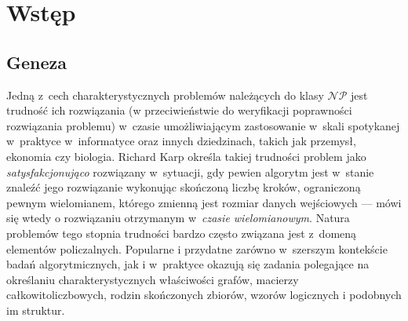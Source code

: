 \chapter{Wstęp}\label{Chapter_Introduction}
\section{Geneza}\label{Section_Genesis}
\par{
  Jedną z~cech charakterystycznych problemów należących do klasy $\mathcal{NP}$ jest trudność ich rozwiązania (w przeciwieństwie do weryfikacji poprawności rozwiązania problemu) w~czasie umożliwiającym zastosowanie w~skali spotykanej w~praktyce w~informatyce oraz innych dziedzinach, takich jak przemysł, ekonomia czy biologia.
  Richard Karp określa takiej trudności problem jako \emph{satysfakcjonująco} rozwiązany w~sytuacji, gdy pewien algorytm jest w~stanie znaleźć jego rozwiązanie wykonując skończoną liczbę kroków, ograniczoną pewnym wielomianem, którego zmienną jest rozmiar danych wejściowych --- mówi się wtedy o rozwiązaniu otrzymanym w~\emph{czasie wielomianowym}.
  Natura problemów tego stopnia trudności bardzo często związana jest z~domeną elementów policzalnych.
  Popularne i przydatne zarówno w~szerszym kontekście badań algorytmicznych, jak i w~praktyce okazują się zadania polegające na określaniu charakterystycznych właściwości grafów, macierzy całkowitoliczbowych, rodzin skończonych zbiorów, wzorów logicznych i podobnych im struktur.
}

